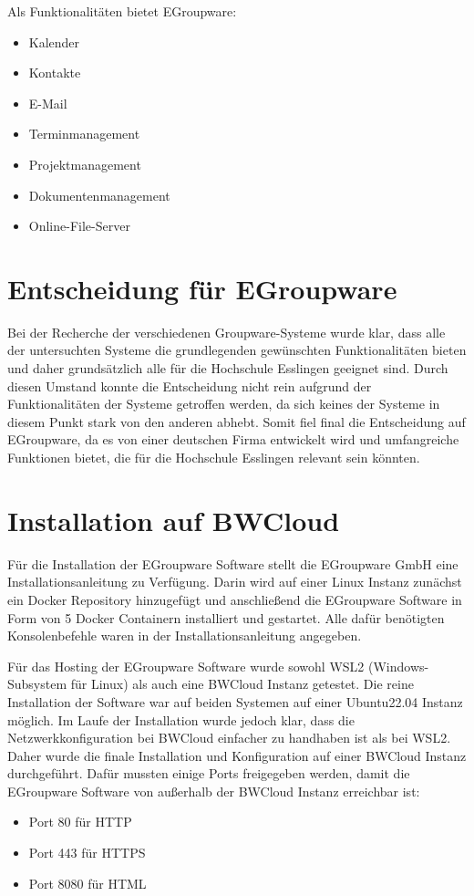 Als Funktionalitäten bietet EGroupware:

\begin{itemize}
    \item Kalender
    \item Kontakte
    \item E-Mail
    \item Terminmanagement
    \item Projektmanagement
    \item Dokumentenmanagement
    \item Online-File-Server
\end{itemize}


\section{Entscheidung für EGroupware}

Bei der Recherche der verschiedenen Groupware-Systeme wurde klar, dass alle der untersuchten Systeme die grundlegenden gewünschten Funktionalitäten bieten und daher grundsätzlich alle für die Hochschule Esslingen geeignet sind.
Durch diesen Umstand konnte die Entscheidung nicht rein aufgrund der Funktionalitäten der Systeme getroffen werden, da sich keines der Systeme in diesem Punkt stark von den anderen abhebt.
Somit fiel final die Entscheidung auf EGroupware, da es von einer deutschen Firma entwickelt wird und umfangreiche Funktionen bietet, die für die Hochschule Esslingen relevant sein könnten.




\section{Installation auf BWCloud}

Für die Installation der EGroupware Software stellt die EGroupware GmbH eine Installationsanleitung zu Verfügung.
Darin wird auf einer Linux Instanz zunächst ein Docker Repository hinzugefügt und anschließend die EGroupware Software in Form von 5 Docker Containern installiert und gestartet.
Alle dafür benötigten Konsolenbefehle waren in der Installationsanleitung angegeben. \autocite{egroupware-installation}

Für das Hosting der EGroupware Software wurde sowohl WSL2 (Windows-Subsystem für Linux) als auch eine BWCloud Instanz getestet.
Die reine Installation der Software war auf beiden Systemen auf einer Ubuntu22.04 Instanz möglich.
Im Laufe der Installation wurde jedoch klar, dass die Netzwerkkonfiguration bei BWCloud einfacher zu handhaben ist als bei WSL2.
Daher wurde die finale Installation und Konfiguration auf einer BWCloud Instanz durchgeführt.
Dafür mussten einige Ports freigegeben werden, damit die EGroupware Software von außerhalb der BWCloud Instanz erreichbar ist:
\begin{itemize}
    \item Port 80 für HTTP
    \item Port 443 für HTTPS
    \item Port 8080 für HTML
\end{itemize}

